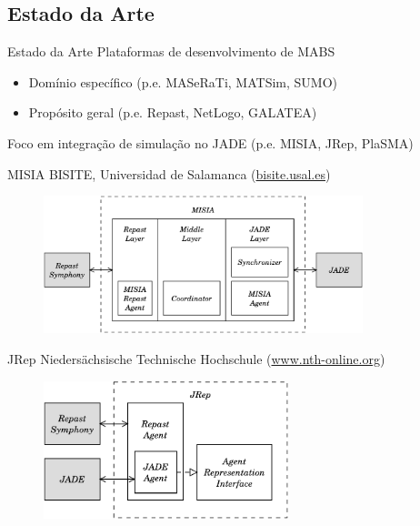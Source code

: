 
\subsection{Estado da Arte}
\begin{frame}{Estado da Arte}
	Plataformas de desenvolvimento de MABS
	\begin{itemize}
		\item Domínio específico (p.e. MASeRaTi, MATSim, SUMO)
		\item Propósito geral (p.e. Repast, NetLogo, GALATEA)
	\end{itemize}

	Foco em integração de simulação no JADE (p.e. MISIA, JRep, PlaSMA)
\end{frame}

\begin{frame}{MISIA}
	BISITE, Universidad de Salamanca (\url{bisite.usal.es})

	\begin{figure}
		\centering
		\includegraphics[height=4cm]{figures/MISIA.pdf}
	\end{figure}
\end{frame}

\begin{frame}{JRep}
	Niedersächsische Technische Hochschule (\url{www.nth-online.org})

	\begin{figure}
		\centering
		\includegraphics[height=4cm]{figures/jrep.pdf}
	\end{figure}
\end{frame}

